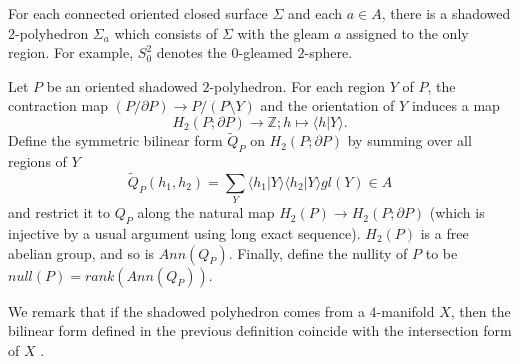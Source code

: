 \noindent For each connected oriented closed surface $\Sigma$ and
each $a \in A$, there is a shadowed $2$-polyhedron $\Sigma_{a}$
which consists of $\Sigma$ with the gleam $a$ assigned to the
only region. For example, $S^{2}_{0}$ denotes the $0$-gleamed
$2$-sphere.

\begin{definition}\label{def/nullity-of-a-shadowed-2-polyhedron}\cite[section VIII.5.1]{turaev-qiok-3-manifolds}
  Let $P$ be an oriented shadowed $2$-polyhedron. For each region
  $Y$ of $P$, the contraction map
  $(P / \partial P) \to P / (P \setminus Y)$ and the orientation
  of $Y$ induces a map
  $$H_{2}(P;\partial P) \to \mathbb{Z}; h \mapsto \langle h | Y \rangle.$$
  Define the symmetric bilinear form $\tilde{Q}_{P}$ on
  $H_{2}(P; \partial P)$ by summing over all regions of $Y$
  $$\tilde{Q}_{P}(h_{1}, h_{2}) = \sum_{Y} \langle h_{1}|Y\rangle \langle h_{2}|Y\rangle gl(Y) \in A$$
  and restrict it to $Q_{P}$ along the natural map
  $H_{2}(P) \to H_{2}(P; \partial P)$ (which is injective by a
  usual argument using long exact sequence). $H_{2}(P)$ is a free
  abelian group, and so is $Ann(Q_{P})$. Finally, define the
  nullity of $P$ to be $null(P) = rank(Ann(Q_{P}))$.
\end{definition}

\noindent We remark that if the shadowed polyhedron comes from a
$4$-manifold $X$, then the bilinear form defined in the previous
definition coincide with the intersection form of $X$
\cite[section IX.5]{turaev-qiok-3-manifolds}.

